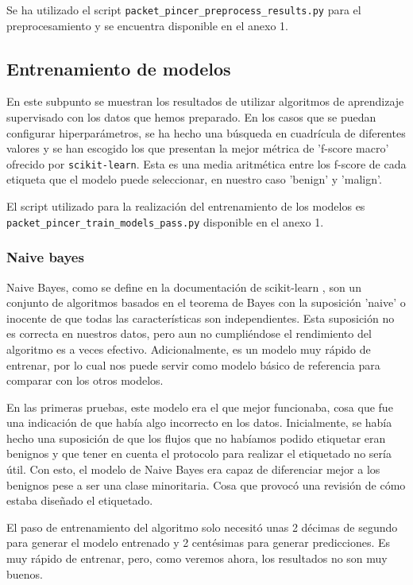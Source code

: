 Se ha utilizado el script \texttt{packet\_\-pincer\_\-preprocess\_\-results.py} para el preprocesamiento y se encuentra disponible en el anexo 1.

\subsection{Entrenamiento de modelos}

En este subpunto se muestran los resultados de utilizar algoritmos de aprendizaje supervisado con los datos que hemos preparado. En los casos que se puedan configurar hiperparámetros, se ha hecho una búsqueda en cuadrícula de diferentes valores y se han escogido los que presentan la mejor métrica de 'f-score macro' ofrecido por \texttt{scikit-learn}. Esta es una media aritmética entre los f-score de cada etiqueta que el modelo puede seleccionar, en nuestro caso 'benign' y 'malign'.

El script utilizado para la realización del entrenamiento de los modelos es \texttt{packet\_\-pincer\_\-train\_\-models\_\-pass.py} disponible en el anexo 1.

\subsubsection{Naive bayes}

Naive Bayes, como se define en la documentación de scikit-learn \cite{sklearnnaivebayes}, son un conjunto de algoritmos basados en el teorema de Bayes con la suposición 'naive' o inocente de que todas las características son independientes. Esta suposición no es correcta en nuestros datos, pero aun no cumpliéndose el rendimiento del algoritmo es a veces efectivo. Adicionalmente, es un modelo muy rápido de entrenar, por lo cual nos puede servir como modelo básico de referencia para comparar con los otros modelos. 

En las primeras pruebas, este modelo era el que mejor funcionaba, cosa que fue una indicación de que había algo incorrecto en los datos. Inicialmente, se había hecho una suposición de que los flujos que no habíamos podido etiquetar eran benignos y que tener en cuenta el protocolo para realizar el etiquetado no sería útil. Con esto, el modelo de Naive Bayes era capaz de diferenciar mejor a los benignos pese a ser una clase minoritaria. Cosa que provocó una revisión de cómo estaba diseñado el etiquetado.

El paso de entrenamiento del algoritmo solo necesitó unas 2 décimas de segundo para generar el modelo entrenado y 2 centésimas para generar predicciones. Es muy rápido de entrenar, pero, como veremos ahora, los resultados no son muy buenos.

